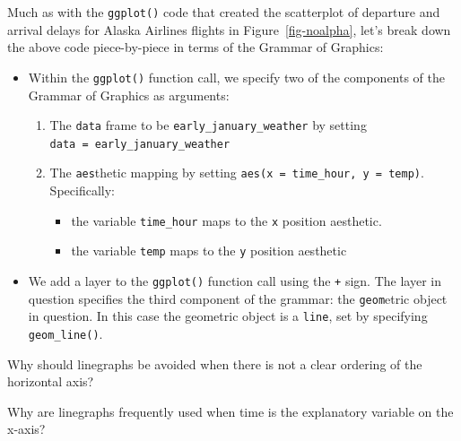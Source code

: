 \documentclass[
  letterpaper,
  DIV=11,
  numbers=noendperiod]{scrreprt}
\providecommand{\tightlist}{%
  \setlength{\itemsep}{0pt}\setlength{\parskip}{0pt}}\usepackage{longtable,booktabs,array}
\theoremstyle{definition}
\theoremstyle{remark}
\begin{document}
Much as with the \texttt{ggplot()} code that created the scatterplot of
departure and arrival delays for Alaska Airlines flights in
Figure~\ref{fig-noalpha}, let's break down the above code piece-by-piece
in terms of the Grammar of Graphics:

\begin{itemize}
\tightlist
\item
  Within the \texttt{ggplot()} function call, we specify two of the
  components of the Grammar of Graphics as arguments:

  \begin{enumerate}
  \def\labelenumi{\arabic{enumi}.}
  \tightlist
  \item
    The \texttt{data} frame to be \texttt{early\_january\_weather} by
    setting \texttt{data\ =\ early\_january\_weather}
  \item
    The \texttt{aes}thetic mapping by setting
    \texttt{aes(x\ =\ time\_hour,\ y\ =\ temp)}. Specifically:

    \begin{itemize}
    \tightlist
    \item
      the variable \texttt{time\_hour} maps to the \texttt{x} position
      aesthetic.
    \item
      the variable \texttt{temp} maps to the \texttt{y} position
      aesthetic
    \end{itemize}
  \end{enumerate}
\item
  We add a layer to the \texttt{ggplot()} function call using the
  \texttt{+} sign. The layer in question specifies the third component
  of the grammar: the \texttt{geom}etric object in question. In this
  case the geometric object is a \texttt{line}, set by specifying
  \texttt{geom\_line()}.
\end{itemize}

\begin{tcolorbox}[enhanced jigsaw, coltitle=black, toprule=.15mm, bottomtitle=1mm, breakable, leftrule=.75mm, title={{🎯} Learning Check 2.11}, opacitybacktitle=0.6, colback=white, rightrule=.15mm, opacityback=0, toptitle=1mm, colbacktitle=quarto-callout-tip-color!10!white, colframe=quarto-callout-tip-color-frame, titlerule=0mm, arc=.35mm, bottomrule=.15mm, left=2mm]
Why should linegraphs be avoided when there is not a clear ordering of
the horizontal axis?
\end{tcolorbox}

\begin{tcolorbox}[enhanced jigsaw, coltitle=black, toprule=.15mm, bottomtitle=1mm, breakable, leftrule=.75mm, title={{🎯} Learning Check 2.12}, opacitybacktitle=0.6, colback=white, rightrule=.15mm, opacityback=0, toptitle=1mm, colbacktitle=quarto-callout-tip-color!10!white, colframe=quarto-callout-tip-color-frame, titlerule=0mm, arc=.35mm, bottomrule=.15mm, left=2mm]
Why are linegraphs frequently used when time is the explanatory variable
on the x-axis?
\end{tcolorbox}
\end{document}
